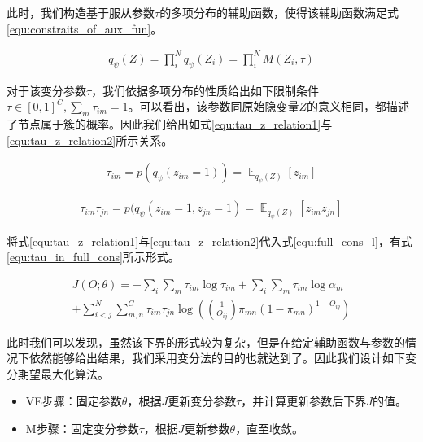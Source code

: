 此时，我们构造基于服从参数$\tau$的多项分布的辅助函数，使得该辅助函数满足式\ref{equ:constraits_of_aux_fun}。

\begin{equation}\label{equ:constraits_of_aux_fun}
  \begin{aligned}
q_\psi(Z)=\prod_i^N q_\psi(Z_i)=\prod_i^N M(Z_i,\tau)
\end{aligned}\end{equation}

对于该变分参数$\tau$，我们依据多项分布的性质给出如下限制条件$\tau \in [0,1]^C,\sum_m \tau_{im} =1$。可以看出，该参数同原始隐变量$Z$的意义相同，都描述了节点属于簇的概率。因此我们给出如式\ref{equ:tau_z_relation1}与\ref{equ:tau_z_relation2}所示关系。

\begin{equation}\label{equ:tau_z_relation1}
  \begin{aligned}
\tau_{im}=p(q_\psi(z_{im}=1))=\mathop{\mathbb{E}}_{q_\psi(Z)}[z_{im}]
\end{aligned}\end{equation}

\begin{equation}\label{equ:tau_z_relation2}
  \begin{aligned}
\tau_{im}\tau_{jn}=p(q_\psi(z_{im}=1,z_{jn}=1) =\mathop{\mathbb{E}}_{q_\psi(Z)}[z_{im}z_{jn}]
\end{aligned}\end{equation}

将式\ref{equ:tau_z_relation1}与\ref{equ:tau_z_relation2}代入式\ref{equ:full_cons_l}，有式\ref{equ:tau_in_full_cons}所示形式。

\begin{equation}\label{equ:tau_in_full_cons}
  \begin{aligned}
J(O;\theta)=-\sum_i\sum_m\tau_{im} \log \tau_{im} +\sum_i\sum_m \tau_{im} \log \alpha_m \\+\sum_{i<j}^N\sum_{m,n}^C\tau_{im}\tau_{jn}\log ( \binom{1}{O_{ij}}\pi_{mn}(1-\pi_{mn})^{1-O_{ij}})
\end{aligned}\end{equation}

此时我们可以发现，虽然该下界的形式较为复杂，但是在给定辅助函数与参数的情况下依然能够给出结果，我们采用变分法的目的也就达到了。因此我们设计如下变分期望最大化算法。

\begin{itemize}
    \item VE步骤：固定参数$\theta$，根据$J$更新变分参数$\tau$，并计算更新参数后下界$J$的值。
    \item M步骤：固定变分参数$\tau$，根据$J$更新参数$\theta$，直至收敛。
\end{itemize}

